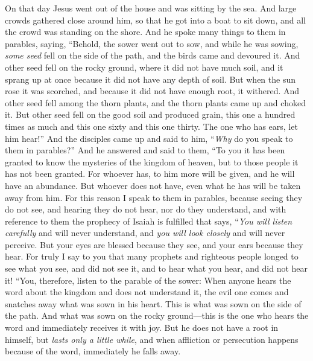 \begin{biblechapter} %
 On that day Jesus went out of the house and was sitting by the sea.
\verse And large crowds gathered close around him, so that he got into a boat to sit down, and all the crowd was standing on the shore.
\verse And he spoke many things to them in parables, saying, “Behold, the sower went out to sow,
\verse and while he was sowing, \textit{some seed} fell on the side of the path, and the birds came and devoured it.
\verse And other seed fell on the rocky ground, where it did not have much soil, and it sprang up at once because it did not have any depth of soil.
\verse But when the sun rose it was scorched, and because it did not have enough root, it withered.
\verse And other seed fell among the thorn plants, and the thorn plants came up and choked it.
\verse But other seed fell on the good soil and produced grain, this one a hundred times as much and this one sixty and this one thirty.
\verse The one who has ears, let him hear!”
 And the disciples came up and said to him, “\textit{Why} do you speak to them in parables?”
\verse And he answered and said to them, “To you it has been granted to know the mysteries of the kingdom of heaven, but to those people it has not been granted.
\verse For whoever has, to him more will be given, and he will have an abundance. But whoever does not have, even what he has will be taken away from him.
\verse For this reason I speak to them in parables, because seeing they do not see, and hearing they do not hear, nor do they understand,
\verse and with reference to them the prophecy of Isaiah is fulfilled that says,
\verse “\textit{You will listen carefully} and will never understand, 
and \textit{you will look closely} and will never perceive.
\verse But your eyes are blessed because they see, and your ears because they hear.
\verse For truly I say to you that many prophets and righteous people longed to see what you see, and did not see it, and to hear what you hear, and did not hear it!
 “You, therefore, listen to the parable of the sower:
\verse When anyone hears the word about the kingdom and does not understand it, the evil one comes and snatches away what was sown in his heart. This is what was sown on the side of the path.
\verse And what was sown on the rocky ground—this is the one who hears the word and immediately receives it with joy.
\verse But he does not have a root in himself, but \textit{lasts only a little while}, and when affliction or persecution happens because of the word, immediately he falls away.

\end{biblechapter}
